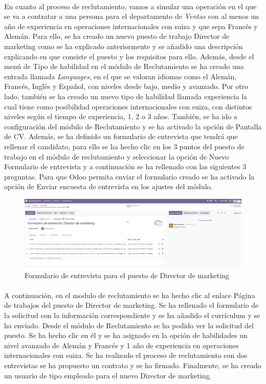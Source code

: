 \paragraph{}
En cuanto al proceso de reclutamiento, vamos a simular una operación en el que se va a contratar a una persona para el departamento de \textit{Ventas} con al menos un año de experiencia en operaciones internacionales con suiza y que sepa Francés y Alemán. Para ello, se ha creado un nuevo puesto de trabajo Director de marketing como se ha explicado anteriormente y se añadido una descripción explicando en que consiste el puesto y los requisitos para ello. Además, desde el menú de Tipo de habilidad en el módulo de Reclutamiento se ha creado una entrada llamada \textit{Languages}, en el que se valoran idiomas como el Alemán, Francés, Inglés y Español, con niveles desde bajo, medio y avanzado. Por otro lado, también se ha creado un nuevo tipo de habilidad llamada experiencia la cual tiene como posibilidad operaciones internacionales con suiza, con distintos niveles según el tiempo de experiencia, 1, 2 o 3 años. También, se ha ido a configuración del módulo de Reclutamiento y se ha activado la opción de Pantalla de CV. Además, se ha definido un formulario de entrevista que tendrá que rellenar el candidato, para ello se ha hecho clic en los 3 puntos del puesto de trabajo en el módulo de reclutamiento y seleccionar la opción de Nuevo Formulario de entrevista y a continuación se ha rellenado con las siguientes 3 preguntas. Para que Odoo permita enviar el formulario creado se ha activado la opción de Enviar encuesta de entrevista en los ajustes del módulo.
\begin{figure}[h]
    \centering
    \includegraphics[width=1\linewidth]{fotosGestPers/image.png}
    \caption{Formulario de entrevista para el puesto de Director de marketing}
    \label{fig:enter-label}
\end{figure}
\paragraph{}
A continuación, en el modulo de reclutamiento se ha hecho clic al enlace Página de trabajos del puesto de Director de marketing. Se ha rellenado el formulario de la solicitud con la información correspondiente y se ha añadido el currículum y se ha enviado. Desde el módulo de Reclutamiento se ha podido ver la solicitud del puesto. Se ha hecho clic en él y se ha asignado en la opción de habilidades un nivel avanzado de Alemán y Francés y 1 año de experiencia en operaciones internacionales con suiza. Se ha realizado el proceso de reclutamiento con dos entrevistas se ha propuesto un contrato y se ha firmado. Finalmente, se ha creado un usuario de tipo empleado para el nuevo Director de marketing.
